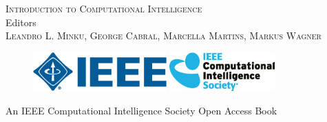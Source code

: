 

\thispagestyle{empty}
\providecommand\pdfbookmark[3][]{} \pdfbookmark[0]{Title Page}{bm:Title}
\vspace*{1cm}
\vfill
\begin{center}
\textsc{\huge{Introduction to Computational Intelligence}}\\
\vfill
Editors\\[\baselineskip]
\textsc{\Large{Leandro L. Minku, George Cabral, Marcella Martins, Markus Wagner}}
\vfill
\end{center}
\begin{figure}[ht!]
\centering
\includegraphics[height=1.5cm]{ieee-logo.png}
\hspace{0.5cm}
\includegraphics[height=1.5cm]{ieee-cis-logo.jpg}
\end{figure}
\begin{center}
An IEEE Computational Intelligence Society Open Access Book\\[-0.8em]
\end{center}
\clearpage

